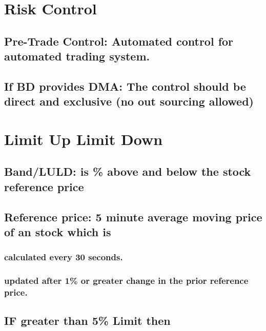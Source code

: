 \documentclass[11pt]{article}
\begin{document}
\section{Risk Control}
\label{sec:org93529b4}
\subsection{Pre-Trade Control: Automated control for automated trading system.}
\label{sec:org80ed030}
\subsection{If BD provides DMA: The control should be direct and exclusive (no out sourcing allowed)}
\label{sec:orgdff8622}

\section{Limit Up Limit Down}
\label{sec:orgf35c69b}
\subsection{Band/LULD: is \% above and below the stock reference price}
\label{sec:orgf0e3de6}
\subsection{Reference price: 5 minute average moving price of an stock which is}
\label{sec:orgd51a6ca}
\subsubsection{calculated every 30 seconds.}
\label{sec:org6203e31}
\subsubsection{updated after 1\% or greater change in the prior reference price.}
\label{sec:org3f30f40}
\subsection{IF greater than 5\% Limit then}
\label{sec:org9b40900}
\end{document}
